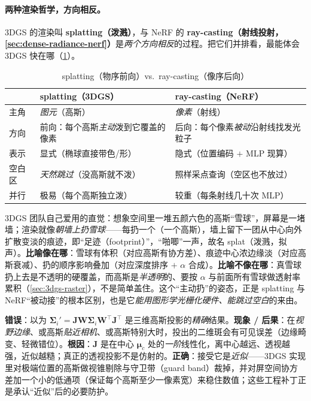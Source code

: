 \paragraph{两种渲染哲学，方向相反。}
3DGS 的渲染叫 \textbf{splatting（泼溅）}，与 NeRF 的 \textbf{ray-casting（射线投射，\cref{sec:dense-radiance-nerf}）}是\emph{两个方向相反}的过程。把它们并排看，最能体会 3DGS 快在哪（\cref{tab:3dgs-splat-vs-ray}）。

\begin{table}[H]\centering
\caption{splatting（物序前向）vs.\ ray-casting（像序后向）}
\label{tab:3dgs-splat-vs-ray}
\small
\begin{tabular}{@{}lll@{}}
\toprule
 & \textbf{splatting（3DGS）}& \textbf{ray-casting（NeRF）}\\
\midrule
主角 & \emph{图元}（高斯）& \emph{像素}（射线）\\
方向 & 前向：每个高斯\emph{主动}泼到它覆盖的像素 & 后向：每个像素\emph{被动}沿射线找发光粒子 \\
表示 & 显式（椭球直接带色/形）& 隐式（位置编码 $+$ MLP 现算）\\
空白区 & \emph{天然跳过}（没高斯就不泼）& 照样采点查询（空区也不放过）\\
并行 & 极易（每个高斯独立泼）& 较重（每条射线几十次 MLP）\\
\bottomrule
\end{tabular}
\end{table}

\begin{insight}
3DGS 团队自己爱用的直觉：想象空间里一堆五颜六色的高斯“雪球”，屏幕是一堵墙；渲染就像\emph{朝墙上扔雪球}——每扔一个（一个高斯），墙上留下一团从中心向外扩散变淡的痕迹，即“足迹（footprint）”，“啪唧”一声，故名 splat（泼溅，拟声）。\textbf{比喻像在哪}：雪球有体积（对应高斯有协方差）、痕迹中心浓边缘淡（对应高斯衰减）、扔的顺序影响叠加（对应深度排序 $+$ $\alpha$ 合成）。\textbf{比喻不像在哪}：真雪球扔上去是不透明的硬覆盖，而高斯是\emph{半透明}的、要按 $\alpha$ 与前面所有雪球做透射率累积（\cref{sec:3dgs-raster}），不是简单盖住。这个“主动扔”的姿态，正是 splatting 与 NeRF“被动接”的根本区别，也是它\emph{能用图形学光栅化硬件、能跳过空白}的来由。
\end{insight}

\begin{pitfall}
\textbf{错误}：以为 $\boldsymbol\Sigma_i'=\mathbf J\mathbf W\boldsymbol\Sigma_i\mathbf W^\top\mathbf J^\top$ 是三维高斯投影的\emph{精确}结果。\textbf{现象 / 后果}：在\emph{视野边缘}、或高斯\emph{贴近相机}、或高斯特别大时，投出的二维斑会有可见误差（边缘畸变、轻微错位）。\textbf{根因}：$\mathbf J$ 是在中心 $\boldsymbol\mu_c$ 处的\emph{一阶}线性化，离中心越远、透视越强，近似越糙；真正的透视投影不是仿射的。\textbf{正确}：接受它是\emph{近似}——3DGS 实现里对极端位置的高斯做视锥剔除与守卫带（guard band）裁掉，并对屏空间协方差加一个小的低通项（保证每个高斯至少一像素宽）来稳住数值；这些工程补丁正是承认“近似”后的必要防护。
\end{pitfall}

